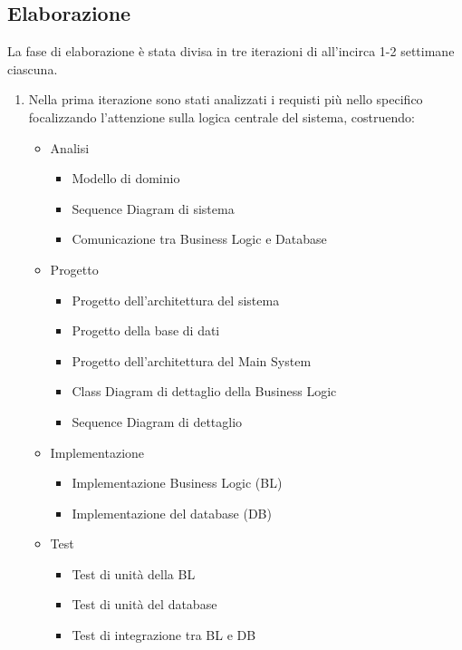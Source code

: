 \subsection{Elaborazione}
La fase di elaborazione è stata divisa in tre iterazioni di all'incirca 1-2 settimane ciascuna.
\begin{enumerate}
	\item Nella prima iterazione sono stati analizzati i requisti più nello specifico focalizzando l'attenzione sulla logica centrale del sistema, costruendo:
	\begin{itemize}
		\item Analisi
		\begin{itemize}
			\item Modello di dominio
			\item Sequence Diagram di sistema
			\item Comunicazione tra Business Logic e Database
		\end{itemize}
		\item Progetto
		\begin{itemize}
			\item Progetto dell'architettura del sistema
			\item Progetto della base di dati
			\item Progetto dell'architettura del Main System
			\item Class Diagram di dettaglio della Business Logic
			\item Sequence Diagram di dettaglio
		\end{itemize}
		\item Implementazione
		\begin{itemize}
			\item Implementazione Business Logic (BL)
			\item Implementazione del database (DB)
		\end{itemize}
		\item Test
		\begin{itemize}
			\item Test di unità della BL
			\item Test di unità del database
			\item Test di integrazione tra BL e DB
		\end{itemize}
	\end{itemize}


\end{enumerate}
